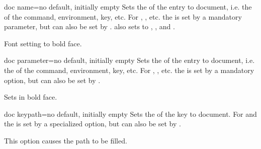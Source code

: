 \begin{docTcbKey}[][doc new={2020-04-22}]{doc name}{=}{no default, initially empty}
  Sets the  of the entry to document, i.e. the  of the
  command, environment, key, etc. For , , etc.
  the  is set by a mandatory parameter, but can also be set
  by .
   also sets  to
  , ,
  and .
\begin{dispExample}
\begin{docCommands}[
    doc no index,  %
    doc name      = bfseries,
  ] {}
  Font setting to bold face.
\end{docCommands}
\end{dispExample}
\end{docTcbKey}


\begin{docTcbKey}[][doc new={2020-04-22}]{doc parameter}{=}{no default, initially empty}
  Sets the  of the entry to document, i.e. the  of the
  command, environment, key, etc. For , , etc.
  the  is set by a mandatory option, but can also be set
  by .
\begin{dispExample}
\begin{docCommands}[
    doc no index,  %
    doc name      = textbf,
    doc parameter = \marg{text},
  ] {}
  Sets  in bold face.
\end{docCommands}
\end{dispExample}
\end{docTcbKey}



\begin{docTcbKey}[][doc new={2020-04-22}]{doc keypath}{=}{no default, initially empty}
  Sets the  of the key to document. For 
  and  the   is set by a specialized option,
  but can also be set by .
\begin{dispExample}
\begin{docKeys}[
    doc no index,  %
    doc keypath     = tikz,
    doc name        = fill,
    doc parameter   = \colOpt{=\meta{color}},
    doc description = default is scope's color setting,
  ] {}
  This option causes the path to be filled.
\end{docKeys}
\end{dispExample}
\end{docTcbKey}

